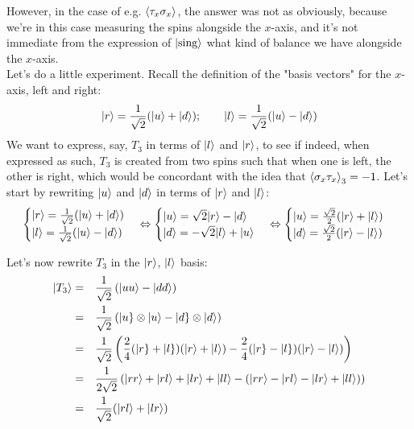 \documentclass[solutions.tex]{subfiles}
\begin{document}
However, in the case of e.g. $\left\langle \tau_x\sigma_x \right\rangle$, the answer was
not as obviously, because we're in this case measuring the spins alongside
the $x$-axis, and it's not immediate from the expression of
$|\text{sing}\rangle$ what kind of balance we have alongside the $x$-axis. \\

Let's do a little experiment. Recall the definition of the "basis
vectors" for the $x$-axis, left and right:
\[
	|r\rangle = \frac1{\sqrt2}(|u\rangle+|d\rangle);\qquad
	|l\rangle = \frac1{\sqrt2}(|u\rangle-|d\rangle)
\]
We want to express, say, $T_3$ in terms of $|l\rangle$ and $|r\rangle$,
to see if indeed, when expressed as such, $T_3$ is created from
two spins such that when one is left, the other is right, which
would be concordant with the idea that $\left\langle \sigma_x\tau_x \right\rangle_3 = -1$.
Let's start by rewriting $|u\rangle$ and $|d\rangle$ in terms of $|r\rangle$
and $|l\rangle$:
\[
	\begin{cases}
		|r\rangle = \frac1{\sqrt2}(|u\rangle+|d\rangle) \\
		|l\rangle = \frac1{\sqrt2}(|u\rangle-|d\rangle)
	\end{cases}\Leftrightarrow\begin{cases}
		|u\rangle = \sqrt2|r\rangle-|d\rangle \\
		|d\rangle = -\sqrt2|l\rangle+|u\rangle \\
	\end{cases}\Leftrightarrow\begin{cases}
		|u\rangle = \frac{\sqrt2}2(|r\rangle+|l\rangle) \\
		|d\rangle = \frac{\sqrt2}2(|r\rangle-|l\rangle) \\
	\end{cases}
\]

Let's now rewrite $T_3$ in the $|r\rangle$, $|l\rangle$ basis:
\begin{equation*}\begin{aligned}
	|T_3\rangle &=&& \frac1{\sqrt2}\left(|uu\rangle-|dd\rangle\right) \\
	~ &=&& \frac1{\sqrt2}\left( |u\}\otimes|u\rangle-|d\}\otimes|d\rangle\right) \\
	~ &=&& \frac1{\sqrt2}\left(
		\frac24(|r\}+|l\})(|r\rangle+|l\rangle)
		-\frac24(|r\}-|l\})(|r\rangle-|l\rangle)
	\right) \\
	~ &=&& \frac1{2\sqrt2}\left(
		|rr\rangle+|rl\rangle+|lr\rangle+|ll\rangle
		-(|rr\rangle-|rl\rangle-|lr\rangle+|ll\rangle)
	\right) \\
	~ &=&&\frac1{\sqrt2}(|rl\rangle+|lr\rangle)
\end{aligned}\end{equation*}
\end{document}
